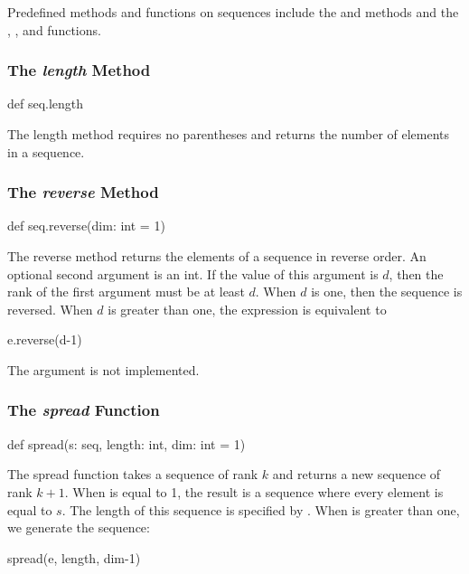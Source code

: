 Predefined methods and functions on sequences include
the  and  methods and
the , , and  functions.

\subsubsection{The {\em length} Method}
\label{The_em_length_Method}

\begin{chapel}
def seq.length
\end{chapel}

The length method requires no parentheses and returns the number of
elements in a sequence.

\subsubsection{The {\em reverse} Method}
\label{The_em_reverse_Method}

\begin{chapel}
def seq.reverse(dim: int = 1)
\end{chapel}

The reverse method returns the elements of a sequence in reverse
order.  An optional second argument is an int. If the value of this
argument is $d$, then the rank of the first argument must be at least
$d$. When $d$ is one, then the sequence is reversed. When $d$ is
greater than one, the expression  is equivalent to
\begin{chapel}
[e in s] e.reverse(d-1)
\end{chapel}

\begin{implementation}
The  argument is not implemented.
\end{implementation}

\subsubsection{The {\em spread} Function}
\label{The_em_spread_Function}

\begin{chapel}
def spread(s: seq, length: int, dim: int = 1)
\end{chapel}

The spread function takes a sequence of rank $k$ and returns a new
sequence of rank $k+1$.  When  is equal to 1, the result is
a sequence where every element is equal to $s$.  The length of this
sequence is specified by .  When  is greater
than one, we generate the sequence:
\begin{chapel}
[e in s] spread(e, length, dim-1)
\end{chapel}

